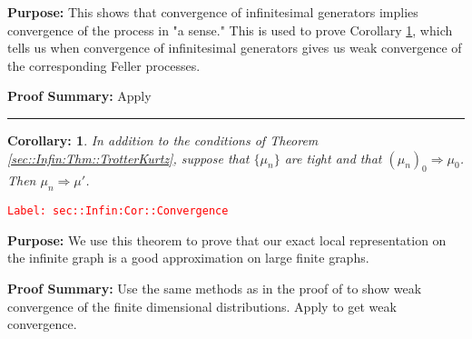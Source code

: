 \documentclass[12pt]{article}
\newcommand{\tr}{\textcolor{red}}
\newcommand{\labe}[1]{\tr{\texttt{Label: #1}}}
\newcommand{\purpose}{\textbf{Purpose: }}
\newcommand{\pfsum}{\textbf{Proof Summary: }}
\newcommand{\lin}{\rule{\linewidth}{0.4 pt}}
\newtheorem{coro}[thms]{Corollary: }
\begin{document}
\purpose This shows that convergence of infinitesimal generators implies convergence of the process in "a sense." This is used to prove Corollary \ref{sec::Infin:Cor::Convergence}, which tells us when convergence of infinitesimal generators gives us weak convergence of the corresponding Feller processes.

\pfsum Apply \cite[Theorem 2.12]{Lig85}

\lin

\begin{coro}
In addition to the conditions of Theorem \ref{sec::Infin:Thm::TrotterKurtz}, suppose that \(\{\mu_n\}\) are tight and that \((\mu_n)_0 \Rightarrow \mu_0\). Then \(\mu_n \Rightarrow \mu'\).
\label{sec::Infin:Cor::Convergence}
\end{coro}
\labe{sec::Infin:Cor::Convergence}

\purpose We use this theorem to prove that our exact local representation on the infinite graph is a good approximation on large finite graphs.

\pfsum Use the same methods as in the proof of \cite[Theorem 4.2]{Kur81} to show weak convergence of the finite dimensional distributions. Apply \cite[Theorem 13.1]{Bil99} to get weak convergence.
\end{document}
